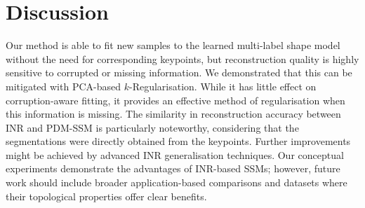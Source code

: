 \section{Discussion}
Our method is able to fit new samples to the learned multi-label shape model without the need for corresponding keypoints, but reconstruction quality is highly sensitive to corrupted or missing information. We demonstrated that this can be mitigated with PCA-based $k$-Regularisation. While it has little effect on corruption-aware fitting, it provides an effective method of regularisation when this information is missing. 
The similarity in reconstruction accuracy between INR and PDM-SSM is particularly noteworthy, considering that the segmentations were directly obtained from the keypoints. Further improvements might be achieved by advanced INR generalisation techniques. Our conceptual experiments demonstrate the advantages of INR-based SSMs; however, future work should include broader application-based comparisons and datasets where their topological properties offer clear benefits.

